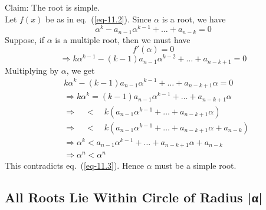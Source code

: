\begin{multicols}{2}
\vspace{-.2cm}

Claim: The root is simple. \\
Let $f(x)$ be as in eq.~(\ref{eq-11.2}). Since $\alpha$ is a root, we have
 \begin{equation}
\alpha^k - a_{n-1}\alpha^{k-1} + \ldots + a_{n-k} = 0\label{eq-11.3}
 \end{equation}
Suppose, if $\alpha$ is a multiple root, then we must have
\begin{equation}
 f'(\alpha) = 0 \label{eq-11.4}
\end{equation}
\begin{equation}
\Rightarrow k\alpha^{k-1}-(k-1)a_{n-1}\alpha^{k-2} + \ldots + a_{n-k+1} = 0 \label{eq-11.5}
\end{equation}
Multiplying by $\alpha$, we get
\begin{align}
 &k\alpha^{k} - (k-1)a_{n-1}\alpha^{k-1} + \ldots + a_{n-k+1}\alpha = 0\nonumber\\
 &\Rightarrow  k\alpha^{k} = (k-1)a_{n-1}\alpha^{k-1} + \ldots + a_{n-k+1}\alpha\nonumber\\
 &\Rightarrow  \quad<\quad k\left( a_{n-1}\alpha^{k-1} + \ldots +a_{n-k+1}\alpha \right)\nonumber\\
 &\Rightarrow  \quad< \quad k\left( a_{n-1}\alpha^{k-1} + \ldots +a_{n-k+1}\alpha + a_{n-k}\right)\nonumber\\
 &\Rightarrow \alpha^{k} <  a_{n-1}\alpha^{k-1} + \ldots + a_{n-k+1}\alpha + a_{n-k}\nonumber\\
 &\Rightarrow\alpha^{n} < \alpha^{n} \nonumber
\end{align}
This contradicts eq.~(\ref{eq-11.3}). Hence $\alpha$ must be a simple root.

\subsection{All Roots Lie Within Circle of Radius |{\greekfont α}|}\label{subsection-11.2}


\end{multicols}
